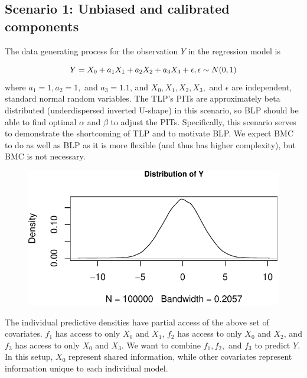\documentclass[
]{article}
\begin{document}
\hypertarget{scenario-1-unbiased-and-calibrated-components}{%
\subsection{Scenario 1: Unbiased and calibrated
components}\label{scenario-1-unbiased-and-calibrated-components}}

The data generating process for the observation \(Y\) in the regression
model is

\[
Y = X_0+a_1X_1+a_2X_2+a_3X_3+ \epsilon, \\
\epsilon \sim N(0,1)
\] where \(a_1=1,a_2=1,\) and \(a_3=1.1\), and \(X_0,X_1,X_2,X_3,\) and
\(\epsilon\) are independent, standard normal random variables. The
TLP's PITs are approximately beta distributed (underdispersed inverted
U-shape) in this scenario, so BLP should be able to find optimal
\(\alpha\) and \(\beta\) to adjust the PITs. Specifically, this scenario
serves to demonstrate the shortcoming of TLP and to motivate BLP. We
expect BMC to do as well as BLP as it is more flexible (and thus has
higher complexity), but BMC is not necessary.

\begin{figure}[H]

{\centering \includegraphics{applied_blp_sim_files/figure-latex/unnamed-chunk-2-1} 

}

\end{figure}

The individual predictive densities have partial access of the above set
of covariates. \(f_1\) has access to only \(X_0\) and \(X_1\), \(f_2\)
has access to only \(X_0\) and \(X_2\), and \(f_3\) has access to only
\(X_0\) and \(X_3\). We want to combine \(f_1,f_2,\) and \(f_3\) to
predict \(Y\). In this setup, \(X_0\) represent shared information,
while other covariates represent information unique to each individual
model.
\end{document}
